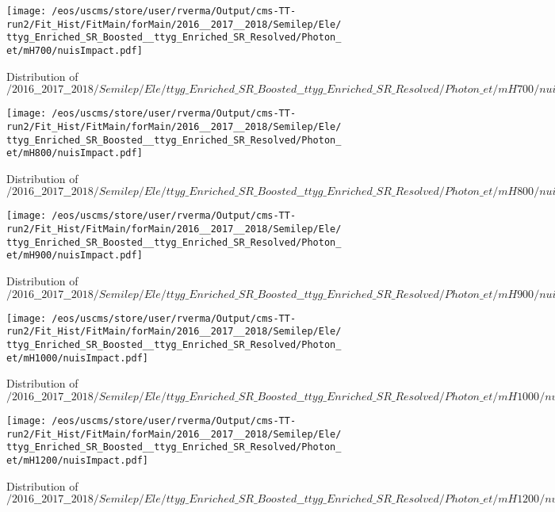\begin{figure}
\centering
\texttt{[image: /eos/uscms/store/user/rverma/Output/cms-TT-run2/Fit\_Hist/FitMain/forMain/2016\_\_2017\_\_2018/Semilep/Ele/ttyg\_Enriched\_SR\_Boosted\_\_ttyg\_Enriched\_SR\_Resolved/Photon\_et/mH700/nuisImpact.pdf]}
\caption{Distribution of $/2016\_\_2017\_\_2018/Semilep/Ele/ttyg\_Enriched\_SR\_Boosted\_\_ttyg\_Enriched\_SR\_Resolved/Photon\_et/mH700/nuisImpact.pdf$}
\end{figure}

\begin{figure}
\centering
\texttt{[image: /eos/uscms/store/user/rverma/Output/cms-TT-run2/Fit\_Hist/FitMain/forMain/2016\_\_2017\_\_2018/Semilep/Ele/ttyg\_Enriched\_SR\_Boosted\_\_ttyg\_Enriched\_SR\_Resolved/Photon\_et/mH800/nuisImpact.pdf]}
\caption{Distribution of $/2016\_\_2017\_\_2018/Semilep/Ele/ttyg\_Enriched\_SR\_Boosted\_\_ttyg\_Enriched\_SR\_Resolved/Photon\_et/mH800/nuisImpact.pdf$}
\end{figure}

\begin{figure}
\centering
\texttt{[image: /eos/uscms/store/user/rverma/Output/cms-TT-run2/Fit\_Hist/FitMain/forMain/2016\_\_2017\_\_2018/Semilep/Ele/ttyg\_Enriched\_SR\_Boosted\_\_ttyg\_Enriched\_SR\_Resolved/Photon\_et/mH900/nuisImpact.pdf]}
\caption{Distribution of $/2016\_\_2017\_\_2018/Semilep/Ele/ttyg\_Enriched\_SR\_Boosted\_\_ttyg\_Enriched\_SR\_Resolved/Photon\_et/mH900/nuisImpact.pdf$}
\end{figure}

\begin{figure}
\centering
\texttt{[image: /eos/uscms/store/user/rverma/Output/cms-TT-run2/Fit\_Hist/FitMain/forMain/2016\_\_2017\_\_2018/Semilep/Ele/ttyg\_Enriched\_SR\_Boosted\_\_ttyg\_Enriched\_SR\_Resolved/Photon\_et/mH1000/nuisImpact.pdf]}
\caption{Distribution of $/2016\_\_2017\_\_2018/Semilep/Ele/ttyg\_Enriched\_SR\_Boosted\_\_ttyg\_Enriched\_SR\_Resolved/Photon\_et/mH1000/nuisImpact.pdf$}
\end{figure}

\begin{figure}
\centering
\texttt{[image: /eos/uscms/store/user/rverma/Output/cms-TT-run2/Fit\_Hist/FitMain/forMain/2016\_\_2017\_\_2018/Semilep/Ele/ttyg\_Enriched\_SR\_Boosted\_\_ttyg\_Enriched\_SR\_Resolved/Photon\_et/mH1200/nuisImpact.pdf]}
\caption{Distribution of $/2016\_\_2017\_\_2018/Semilep/Ele/ttyg\_Enriched\_SR\_Boosted\_\_ttyg\_Enriched\_SR\_Resolved/Photon\_et/mH1200/nuisImpact.pdf$}
\end{figure}

